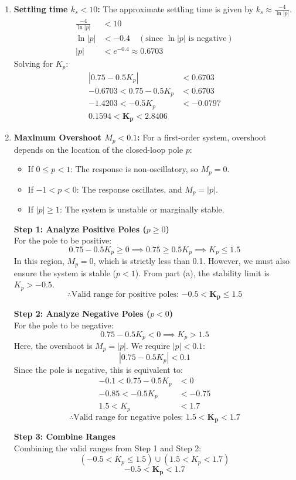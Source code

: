 \documentclass[a4paper,12pt]{article}
\begin{document}
\begin{enumerate}[label=\alph*.]
    \item \textbf{Settling time $k_s < 10$:}
    The approximate settling time is given by $k_s \approx \frac{-4}{\ln|p|}$.
    \begin{align*}
        \frac{-4}{\ln|p|} &< 10 \\
        \ln|p| &< -0.4 \quad (\text{since } \ln|p| \text{ is negative}) \\
        |p| &< e^{-0.4} \approx 0.6703
    \end{align*}
    Solving for $K_p$:
    \begin{align*}
        |0.75 - 0.5K_p| &< 0.6703 \\
        -0.6703 < 0.75 - 0.5K_p &< 0.6703 \\
        -1.4203 < -0.5K_p &< -0.0797 \\
        \mathbf{0.1594 < K_p < 2.8406}
    \end{align*}

    \item \textbf{Maximum Overshoot $M_p < 0.1$:}
    For a first-order system, overshoot depends on the location of the closed-loop pole $p$:
    \begin{itemize}
        \item If $0 \le p < 1$: The response is non-oscillatory, so $M_p = 0$.
        \item If $-1 < p < 0$: The response oscillates, and $M_p = |p|$.
        \item If $|p| \ge 1$: The system is unstable or marginally stable.
    \end{itemize}

    \textbf{Step 1: Analyze Positive Poles ($p \ge 0$)} \\
    For the pole to be positive:
    \[ 0.75 - 0.5K_p \ge 0 \implies 0.75 \ge 0.5K_p \implies K_p \le 1.5 \]
    In this region, $M_p = 0$, which is strictly less than 0.1. However, we must also ensure the system is stable ($p < 1$). From part (a), the stability limit is $K_p > -0.5$.
    \[ \therefore \text{Valid range for positive poles: } \mathbf{-0.5 < K_p \le 1.5} \]

    \textbf{Step 2: Analyze Negative Poles ($p < 0$)} \\
    For the pole to be negative:
    \[ 0.75 - 0.5K_p < 0 \implies K_p > 1.5 \]
    Here, the overshoot is $M_p = |p|$. We require $|p| < 0.1$:
    \[ |0.75 - 0.5K_p| < 0.1 \]
    Since the pole is negative, this is equivalent to:
    \begin{align*}
        -0.1 < 0.75 - 0.5K_p &< 0 \\
        -0.85 < -0.5K_p &< -0.75 \\
        1.5 < K_p &< 1.7
    \end{align*}
    \[ \therefore \text{Valid range for negative poles: } \mathbf{1.5 < K_p < 1.7} \]

    \textbf{Step 3: Combine Ranges} \\
    Combining the valid ranges from Step 1 and Step 2:
    \[ (-0.5 < K_p \le 1.5) \cup (1.5 < K_p < 1.7) \]
    \[ \mathbf{-0.5 < K_p < 1.7} \]
\end{enumerate}
\end{document}

